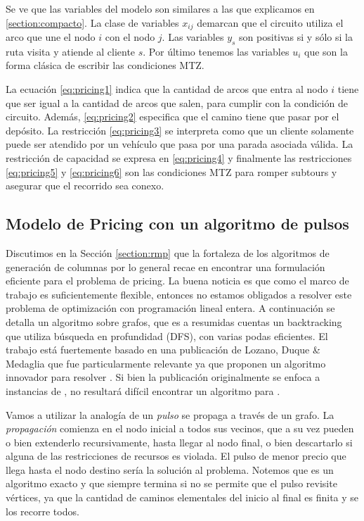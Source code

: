 Se ve que las variables del modelo son similares a las que explicamos en \ref{section:compacto}. La clase de variables $x_{ij}$ demarcan que el circuito utiliza el arco que une el nodo $i$ con el nodo $j$. Las variables $y_s$ son positivas si y sólo si la ruta visita y atiende al cliente $s$. Por último tenemos las variables $u_i$ que son la forma clásica de escribir las condiciones MTZ.

La ecuación \ref{eq:pricing1} indica que la cantidad de arcos que entra al nodo $i$ tiene que ser igual a la cantidad de arcos que salen, para cumplir con la condición de circuito. Además, \ref{eq:pricing2} especifica que el camino tiene que pasar por el depósito. La restricción \ref{eq:pricing3} se interpreta como que un cliente solamente puede ser atendido por un vehículo que pasa por una parada asociada válida. La restricción de capacidad se expresa en \ref{eq:pricing4} y finalmente las restricciones \ref{eq:pricing5} y \ref{eq:pricing6} son las condiciones MTZ para romper subtours y asegurar que el recorrido sea conexo.

\subsection{Modelo de Pricing con un algoritmo de pulsos}
\label{section:pricing-pulses}

Discutimos en la Sección \ref{section:rmp} que la fortaleza de los algoritmos de generación de columnas por lo general recae en encontrar una formulación eficiente para el problema de pricing. La buena noticia es que como el marco de trabajo es suficientemente flexible, entonces no estamos obligados a resolver este problema de optimización con programación lineal entera. A continuación se detalla un algoritmo sobre grafos, que es a resumidas cuentas un backtracking que utiliza búsqueda en profundidad (DFS), con varias podas eficientes. El trabajo está fuertemente basado en una publicación de Lozano, Duque \& Medaglia \cite{lozano-duque-medaglia} que fue particularmente relevante ya que proponen un algoritmo innovador para resolver . Si bien la publicación originalmente se enfoca a instancias de , no resultará difícil encontrar un algoritmo para .

Vamos a utilizar la analogía de un \emph{pulso} se propaga a través de un grafo. La \emph{propagación} comienza en el nodo inicial a todos sus vecinos, que a su vez pueden o bien extenderlo recursivamente, hasta llegar al nodo final, o bien descartarlo si alguna de las restricciones de recursos es violada. El pulso de menor precio que llega hasta el nodo destino sería la solución al problema. Notemos que es un algoritmo exacto y que siempre termina si no se permite que el pulso revisite vértices, ya que la cantidad de caminos elementales del inicio al final es finita y se los recorre todos. 

